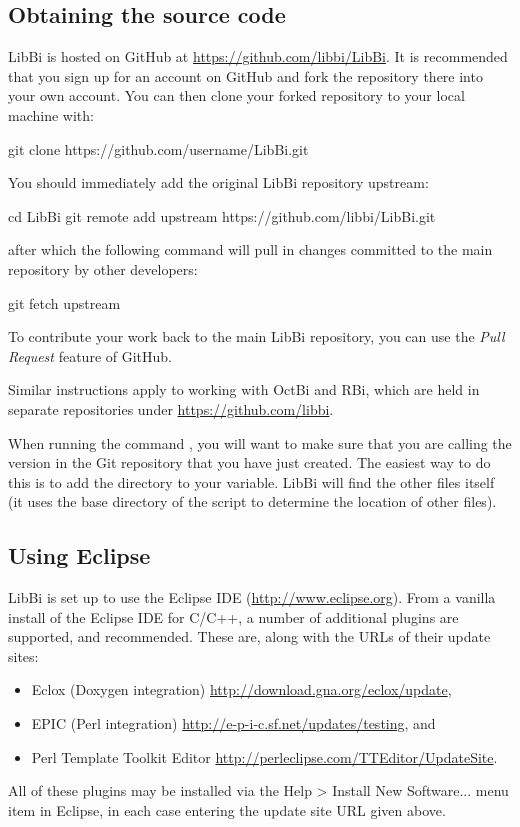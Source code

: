 \subsection{Obtaining the source code}

LibBi is hosted on GitHub at
\href{https://github.com/libbi/LibBi}{https://github.com/libbi/LibBi}. It is
recommended that you sign up for an account on GitHub and fork the repository
there into your own account. You can then clone your forked repository to your
local machine with:
\begin{cmdcode}
git clone https://github.com/username/LibBi.git
\end{cmdcode}
You should immediately add the original LibBi repository upstream:
\begin{cmdcode}
cd LibBi
git remote add upstream https://github.com/libbi/LibBi.git
\end{cmdcode}
after which the following command will pull in changes committed to the main
repository by other developers:
\begin{cmdcode}
git fetch upstream
\end{cmdcode}
To contribute your work back to the main LibBi repository, you can use the
\emph{Pull Request} feature of GitHub.

Similar instructions apply to working with OctBi and RBi, which are held in
separate repositories under
\href{https://github.com/libbi}{https://github.com/libbi}.

When running the command , you will want to make sure that you are
calling the version in the Git repository that you have just created. The
easiest way to do this is to add the  directory to your
 variable. LibBi will find the other files itself (it uses the
base directory of the  script to determine the location of other
files).

\subsection{Using Eclipse\label{Using_Eclipse}}

LibBi is set up to use the Eclipse IDE
(\href{http://www.eclipse.org}{http://www.eclipse.org}). From a vanilla
install of the Eclipse IDE for C/C++, a number of additional plugins are
supported, and recommended. These are, along with the URLs of their update
sites:
\begin{itemize}
\item Eclox (Doxygen integration) \href{http://download.gna.org/eclox/update}{http://download.gna.org/eclox/update},
\item EPIC (Perl integration) \href{http://e-p-i-c.sf.net/updates/testing}{http://e-p-i-c.sf.net/updates/testing}, and
\item Perl Template Toolkit Editor \href{http://perleclipse.com/TTEditor/UpdateSite}{http://perleclipse.com/TTEditor/UpdateSite}.
\end{itemize}
All of these plugins may be installed via the \textsf{Help > Install New Software...}
menu item in Eclipse, in each case entering the update site URL given above.

